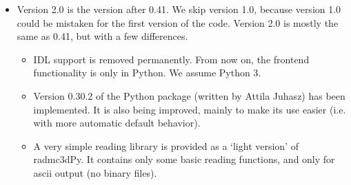 \documentclass[letterpaper,10pt,english]{sphinxmanual}
\begin{document}
\begin{itemize}
\begin{itemize}
\item {} 
Bugfixes to the OpenMP stuff. In particular the OpenMP
parallellization of the scattering MC crashed. This is now fixed.
In general the OpenMP stuff was a bit cleaned up.

\item {} 
Bugfix in thermal Monte Carlo with full polarization mode: needed
to reset the photon package after each thermal absorption/re\sphinxhyphen{}emission
event. Usually the effect is subtle, but had to be fixed.

\item {} 
Bugfix in reading the :
the  angles should be converted into radian. But
this file was not officially offered before anyway.

\item {} 
Attila Juhasz has made a large improvement of his python package
for RADMC\sphinxhyphen{}3D. See the  directory. This is version
0.29 of his package. This package now also supports reading and
writing AMR grids.

\item {} 
Bugfix in VTK for 3\sphinxhyphen{}D spherical coordinates (thanks Attila Juhasz!).
Now it should work.

\end{itemize}

\item {} 

Version 2.0 is the version after 0.41. We skip version 1.0, because
version 1.0 could be mistaken for the first version of the code. Version
2.0 is mostly the same as 0.41, but with a few differences.
\begin{itemize}
\item {} 
IDL support is removed permanently. From now on, the front\sphinxhyphen{}end
functionality is only in Python. We assume Python 3.

\item {} 
Version 0.30.2 of the  Python package (written by
Attila Juhasz) has been implemented. It is also being improved, mainly to
make its use easier (i.e. with more automatic default behavior).

\item {} 
A very simple  reading library is provided
as a ‘light version’ of radmc3dPy. It contains only some basic reading
functions, and only for ascii output (no binary files).


\end{itemize}
\end{itemize}
\end{document}
